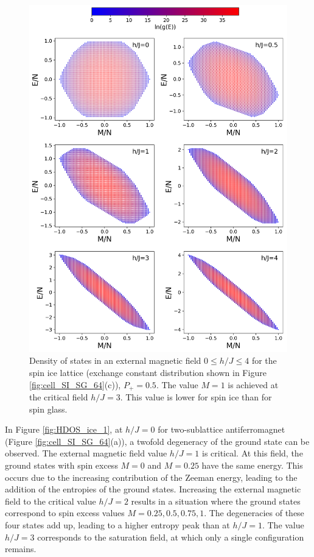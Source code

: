 \documentclass[preprint,12pt]{elsarticle}
\begin{document}
	
	\begin{figure}[H]
		\centering
		\includegraphics[width=1\linewidth]{pictures/HDOS_SI_64_J0.png}
		\caption{Density of states in an external magnetic field $0\leq h/J \leq 4$ for the spin ice lattice (exchange constant distribution shown in Figure \ref{fig:cell_SI_SG_64}(c)), $P_+ = 0.5$. The value $M=1$ is achieved at the critical field $h/J=3$. This value is lower for spin ice than for spin glass.}
		\label{fig:HDOS_ice}
	\end{figure}
	
	In Figure \ref{fig:HDOS_ice_1}, at $h/J = 0$ for two-sublattice antiferromagnet (Figure \ref{fig:cell_SI_SG_64}(a)), a twofold degeneracy of the ground state can be observed. The external magnetic field value $h/J = 1$ is critical. At this field, the ground states with spin excess $M = 0$ and $M = 0.25$ have the same energy. This occurs due to the increasing contribution of the Zeeman energy, leading to the addition of the entropies of the ground states.  
	Increasing the external magnetic field to the critical value $h/J = 2$ results in a situation where the ground states correspond to spin excess values $M = 0.25, 0.5, 0.75, 1$. The degeneracies of these four states add up, leading to a higher entropy peak than at $h/J = 1$.  
	The value $h/J = 3$ corresponds to the saturation field, at which only a single configuration remains.
	
\end{document}
